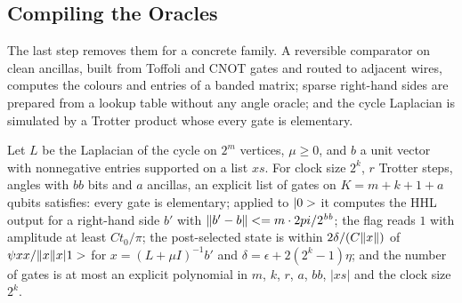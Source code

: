 \subsection{Compiling the Oracles}\label{sec:lap}

 The last step removes them for a concrete family. A reversible
comparator on clean ancillas, built from Toffoli and CNOT gates and routed to adjacent wires, computes
the colours and entries of a banded matrix; sparse right-hand sides are prepared from a lookup table
without any angle oracle; and the cycle Laplacian is simulated by a Trotter product whose every gate
is elementary.

\begin{theorem}\label{thm:lap}
Let $L$ be the Laplacian of the cycle on $2^m$ vertices, $\mu\ge0$, and $b$ a unit vector with
nonnegative entries supported on a list $xs$. For clock size $2^k$, $r$ Trotter steps, angles with
$\mathit{bb}$ bits and $a$ ancillas, an explicit list of gates on $K=m+k+1+a$ qubits satisfies: every
gate is elementary; applied to $|0>$ it computes the HHL output for a right-hand side $b'$ with
$\|b'-b\|<= m\cdot2pi/2^{\mathit{bb}}$; the flag reads $1$ with amplitude at least $Ct_0/\pi$;
the post-selected state is within $2\delta/(C\|x\|)$ of $\psi x x/\|x\|x|1>$ for
$x=(L+\mu I)^{-1}b'$ and $\delta=\epsilon+2(2^k-1)\eta$; and the number of gates is at most an explicit
polynomial in $m$, $k$, $r$, $a$, $\mathit{bb}$, $|xs|$ and the clock size $2^k$.
\end{theorem}


